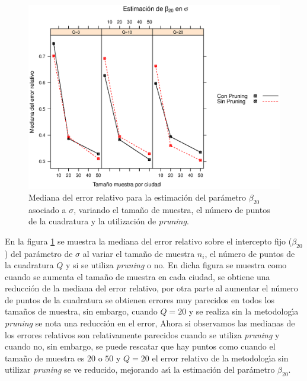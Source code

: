 \begin{figure}
	\begin{center}
		\includegraphics[scale=0.6]{MAPE_beta0_sigma.eps}	
		\caption{Mediana del error relativo para la estimaci\'{o}n del par\'{a}metro $\beta_{20}$ asociado a $\sigma$, variando el tama\~{n}o de muestra, el n\'{u}mero de puntos de la cuadratura y  la utilizaci\'{o}n de \textit{pruning}.}
		\label{MAPE_beta0_sigma}
	\end{center}
\end{figure}

En la figura \ref{MAPE_beta0_sigma} se muestra la mediana del error relativo sobre el intercepto fijo ($\beta_{20}$) del par\'{a}metro de $\sigma$ al variar el tama\~{n}o de muestra $n_i$, el n\'{u}mero de puntos de la cuadratura $Q$ y si se utiliza \textit{pruning} o no. En dicha figura se muestra como cuando se aumenta el tama\~{n}o de muestra en cada ciudad, se obtiene una reducci\'{o}n de la mediana del error relativo, por otra parte al aumentar el n\'{u}mero de puntos de la cuadratura se obtienen errores muy parecidos en todos los tama\~{n}os de muestra, sin embargo, cuando $Q=20$ y se realiza sin la metodolog\'{\i}a \textit{pruning} se nota una reducci\'{o}n en el error, Ahora si observamos las medianas de los errores relativos son relativamente parecidos cuando se utiliza \textit{pruning} y cuando no, sin embargo, se puede rescatar que hay puntos como cuando el tama\~{n}o de muestra es $20$ o $50$ y $Q=20$ el error relativo de la metodolog\'{\i}a sin utilizar \textit{pruning} se ve reducido, mejorando as\'{\i} la estimaci\'{o}n del par\'{a}metro $\beta_{20}$.\\


